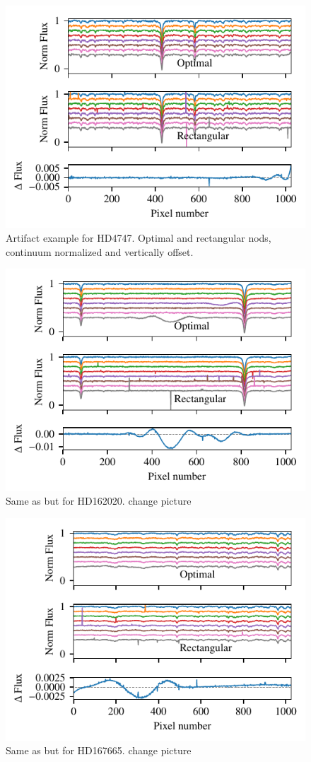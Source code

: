  \begin{figure}
     \centering
     \includegraphics[width=0.7\linewidth]{figures/reduction/bp_plots/extraction_comparision_HD4747-1_chip_1}
     \caption{Artifact example for HD4747. Optimal and rectangular nods, continuum normalized and vertically offset.}
     \label{fig:artifact_example1}
 \end{figure}
 \begin{figure}
     \centering
     \includegraphics[width=0.7\linewidth]{figures/reduction/bp_plots/extraction_comparision_HD4747-1_chip_2}
     \caption{Same as  but for HD162020. {\red change picture}}
     \label{fig:artifact_example2}
 \end{figure}
 \begin{figure}
     \centering
     \includegraphics[width=0.7\linewidth]{figures/reduction/bp_plots/extraction_comparision_HD4747-1_chip_3}
     \caption{Same as  but for HD167665. {\red change picture}}
     \label{fig:artifact_example3}
 \end{figure}

